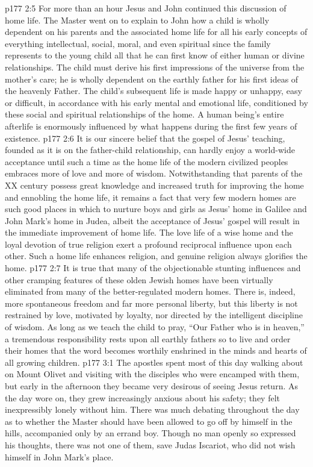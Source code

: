 \vs p177 2:5 For more than an hour Jesus and John continued this discussion of home life. The Master went on to explain to John how a child is wholly dependent on his parents and the associated home life for all his early concepts of everything intellectual, social, moral, and even spiritual since the family represents to the young child all that he can first know of either human or divine relationships. The child must derive his first impressions of the universe from the mother’s care; he is wholly dependent on the earthly father for his first ideas of the heavenly Father. The child’s subsequent life is made happy or unhappy, easy or difficult, in accordance with his early mental and emotional life, conditioned by these social and spiritual relationships of the home. A human being’s entire afterlife is enormously influenced by what happens during the first few years of existence.
\vs p177 2:6 \pc It is our sincere belief that the gospel of Jesus’ teaching, founded as it is on the father\hyp{}child relationship, can hardly enjoy a world\hyp{}wide acceptance until such a time as the home life of the modern civilized peoples embraces more of love and more of wisdom. Notwithstanding that parents of the XX century possess great knowledge and increased truth for improving the home and ennobling the home life, it remains a fact that very few modern homes are such good places in which to nurture boys and girls as Jesus’ home in Galilee and John Mark’s home in Judea, albeit the acceptance of Jesus’ gospel will result in the immediate improvement of home life. The love life of a wise home and the loyal devotion of true religion exert a profound reciprocal influence upon each other. Such a home life enhances religion, and genuine religion always glorifies the home.
\vs p177 2:7 It is true that many of the objectionable stunting influences and other cramping features of these olden Jewish homes have been virtually eliminated from many of the better\hyp{}regulated modern homes. There is, indeed, more spontaneous freedom and far more personal liberty, but this liberty is not restrained by love, motivated by loyalty, nor directed by the intelligent discipline of wisdom. As long as we teach the child to pray, “Our Father who is in heaven,” a tremendous responsibility rests upon all earthly fathers so to live and order their homes that the word  becomes worthily enshrined in the minds and hearts of all growing children.
\vs p177 3:1 The apostles spent most of this day walking about on Mount Olivet and visiting with the disciples who were encamped with them, but early in the afternoon they became very desirous of seeing Jesus return. As the day wore on, they grew increasingly anxious about his safety; they felt inexpressibly lonely without him. There was much debating throughout the day as to whether the Master should have been allowed to go off by himself in the hills, accompanied only by an errand boy. Though no man openly so expressed his thoughts, there was not one of them, save Judas Iscariot, who did not wish himself in John Mark’s place.
